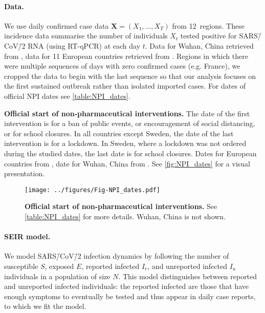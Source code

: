 \documentclass[12pt]{extarticle}
\newcommand{\sars}{SARS\=/CoV\=/2 }
\let\vec\mathbf
\begin{document}
\paragraph*{Data.} 
We use daily confirmed case data $\vec{X}=(X_1, \ldots, X_T)$ from 12~regions. These incidence data summarise the number of individuals $X_t$ tested positive for \sars RNA (using RT-qPCR) at each day $t$.
Data for Wuhan, China retrieved from \citet{Pei2020}, data for 11 European countries retrieved from \citet{Flaxman2020}. 
Regions in which there were multiple sequences of days with zero confirmed cases (e.g. France), we cropped the data to begin with the last sequence so that our analysis focuses on the first sustained outbreak rather than isolated imported cases. 
For dates of official NPI dates see \autoref{table:NPI_dates}.


 
\begin{table}[h]
\centering
{}
\caption{
\textbf{Official start of non-pharmaceutical interventions.}
The date of the first intervention is for a ban of public events, or encouragement of social distancing, or for school closures.
In all countries except Sweden, the date of the last intervention is for a lockdown. In Sweden, where a lockdown was not ordered during the studied dates, the last date is for school closures. Dates for European countries from \citet{Flaxman2020}, date for Wuhan, China from \citet{Pei2020}. See \autoref{fig:NPI_dates} for a visual presentation.
}
\label{table:NPI_dates}
\end{table}



\begin{figure}[h]
    \centering
	\texttt{[image: ../figures/Fig-NPI\_dates.pdf]}
    \caption{
    \textbf{Official start of non-pharmaceutical interventions.}
	See \autoref{table:NPI_dates} for more details. Wuhan, China is not shown.
    } 
    \label{fig:NPI_dates}
\end{figure}



\paragraph*{SEIR model.} \label{sec:model}
We model SARS\=/CoV\=/2 infection dynamics by following the number of susceptible $S$, exposed $E$, reported infected $I_r$, and unreported infected $I_u$ individuals in a population of size $N$.
This model distinguishes between reported and unreported infected individuals: the reported infected are those that have enough symptoms to eventually be tested and thus appear in daily case reports, to which we fit the model.
\end{document}
